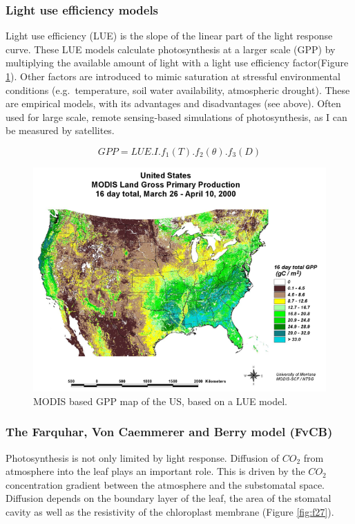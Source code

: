 \documentclass[12pt,oneside]{book}
\begin{document}
\subsubsection{Light use efficiency
models}\label{light-use-efficiency-models}

Light use efficiency (LUE) is the slope of the linear part of the light
response curve. These LUE models calculate photosynthesis at a larger
scale (GPP) by multiplying the available amount of light with a light
use efficiency factor(Figure \ref{fig:f26}). Other factors are
introduced to mimic saturation at stressful environmental conditions
(e.g.~temperature, soil water availability, atmospheric drought). These
are empirical models, with its advantages and disadvantages (see above).
Often used for large scale, remote sensing-based simulations of
photosynthesis, as I can be measured by satellites.

\[
GPP=LUE.I.f_1(T).f_2(\theta).f_3(D)
\]

\begin{figure}

{\centering \includegraphics[width=0.8\linewidth]{figures/chap2/MODIS_GPP} 

}

\caption{MODIS based GPP map of the US, based on a LUE model.}\label{fig:f26}
\end{figure}

\subsubsection{The Farquhar, Von Caemmerer and Berry model
(FvCB)}\label{the-farquhar-von-caemmerer-and-berry-model-fvcb}

Photosynthesis is not only limited by light response. Diffusion of
\(CO_2\) from atmosphere into the leaf plays an important role. This is
driven by the \(CO_2\) concentration gradient between the atmosphere and
the substomatal space. Diffusion depends on the boundary layer of the
leaf, the area of the stomatal cavity as well as the resistivity of the
chloroplast membrane (Figure \ref{fig:f27}).
\end{document}
